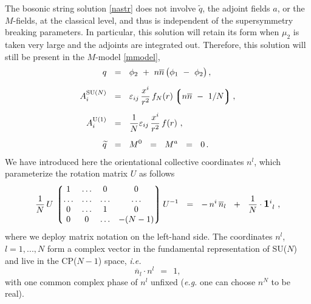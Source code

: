 \documentclass[12pt]{article}
\def\beq{\begin{equation}}
\def\eeq{\end{equation}}
\newcommand{\wt}{\widetilde}
\newcommand{\ov}{\overline}
\newcommand{\lgr}{\left\lgroup}
\newcommand{\rgr}{\right\rgroup}
\newcommand{\nbar}{\ov{n}}
\begin{document}
	The bosonic string solution \eqref{nastr} does not involve $ \wt{q} $, the adjoint fields $ a $,
	or the $ M $-fields, at the classical level, and thus is independent of the supersymmetry
	breaking parameters.
	In particular, this solution will retain its form when $ \mu_2 $ is taken very large and the 
	adjoints are integrated out.
	Therefore, this solution will still be present in the $M$-model \eqref{mmodel}, 
\begin{align}
%
\notag
	q & ~~=~~ 
		\phi_2 ~+~ n\nbar\, \bigl( \phi_1 ~-~ \phi_2 \bigr) \,,
	\\[2mm]
%
\label{str}
	A_i^\text{SU($N$)} & ~~=~~ \varepsilon_{ij}\, \frac{x^i}{r^2}\, f_{N}(r)
				\lgr n\nbar ~-~ 1/N \rgr,
	\\[2mm]
%
\notag
	A_i^{\rm U(1)} & ~~=~~ \frac{1}{N}\varepsilon_{ij}\, \frac{x^i}{r^2}\, f(r)~, 
	\\[2mm]
%
\notag
	\wt{q} & ~~=~~ M^0 ~~=~~ M^a ~~=~~ 0\,.
\end{align}
	We have introduced here the orientational collective coordinates $ n^l $, which
	parameterize the rotation matrix $ U $ as follows
\beq
\label{n}
	\frac{1}{N}\, U \, \lgr \begin{matrix}
				  1  & \ldots & 0 & 0 \\
				  \ldots & \ldots & \ldots & \ldots \\
				  0 & \ldots & 1 & 0  \\
				  0 & 0 & \ldots & -(N-1) 
				\end{matrix} \rgr
			U^{-1}  
	~~=~~
	-\, n^i\,\ov{n}{}_l  ~~+~~ \frac{1}{N}\cdot{\mathlarger{\mathbf{1}}}{}^i_{~l} ~,
\eeq
	where we deploy matrix notation on the left-hand side.
	The coordinates $ n^l $, $ l = 1, ..., N $ form a complex vector in the fundamental representation
	of SU($N$) and live in the CP($N-1$) space, {\it i.e.}
\beq
\label{unitvec}
		\ov{n}{}_l \cdot n^l ~~=~~ 1,
\eeq
	with one common complex phase of $ n^l $ unfixed ({\it e.g.} one can choose $ n^N $ to be real).
\end{document}
